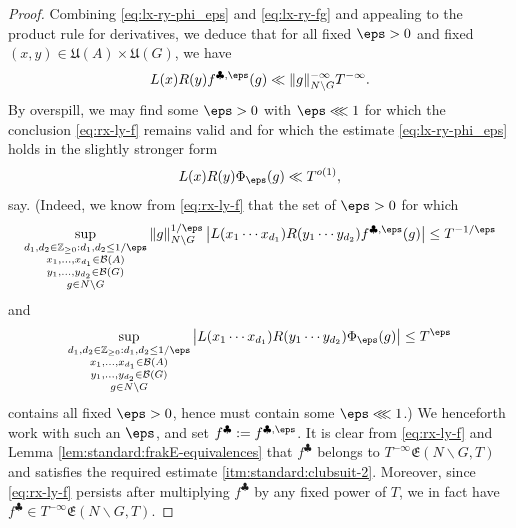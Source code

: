 \begin{proof}
  Combining \eqref{eq:lx-ry-phi_eps} and \eqref{eq:lx-ry-fg} and appealing to the product rule for derivatives, we deduce that for all fixed $\eps > 0$ and fixed $(x,y) \in \mathfrak{U}(A) \times \mathfrak{U}(G)$, we have
  \begin{equation}\label{eq:rx-ly-f}
    L(x) R(y)
    f^{\clubsuit, \eps }(g)
    \ll \|g\|_{N \backslash G}^{-\infty} T^{-\infty}.
  \end{equation}
  By overspill, we may find some $\eps > 0$ with $\eps \lll 1$ for which the conclusion \eqref{eq:rx-ly-f} remains valid and for which the estimate  \eqref{eq:lx-ry-phi_eps} holds in the slightly stronger form
  \begin{equation*}
    L(x) R(y) \Phi_\eps (g) \ll T^{o(1)},
  \end{equation*}
  say.
  (Indeed, we know from \eqref{eq:rx-ly-f} that the set of $\eps > 0$ for which
  \begin{equation*}
    \sup_{
      \substack{
        d_1,d_2 \in \mathbb{Z} _{\geq 0} :   d_1, d_2 \leq 1/\eps \\
        x_1,\dotsc, x_{d_1} \in \mathcal{B}(A) \\
        y_1,\dotsc, y_{d_2} \in \mathcal{B}(G) \\
        g \in N \backslash G}
    }
    \|g\|_{N \backslash G}^{1/\eps}
    \left\lvert L(x_1 \dotsb x_{d_1}) R(y_1 \dotsb y_{d_2}) f^{\clubsuit,\eps}(g) \right\rvert \leq T^{-1/\eps}
  \end{equation*}
  and
  \begin{equation*}
    \sup_{
      \substack{
        d_1,d_2 \in \mathbb{Z} _{\geq 0} :   d_1, d_2 \leq 1/\eps \\
        x_1,\dotsc, x_{d_1} \in \mathcal{B}(A) \\
        y_1,\dotsc, y_{d_2} \in \mathcal{B}(G) \\
        g \in N \backslash G}
    }
    \left\lvert L(x_1 \dotsb x_{d_1}) R(y_1 \dotsb y_{d_2}) \Phi_\eps (g)  \right\rvert \leq T^{\eps}
  \end{equation*}
  contains all fixed $\eps > 0$, hence must contain some $\eps \lll 1$.)  We henceforth work with such an $\eps$, and set $f^{\clubsuit} := f^{\clubsuit, \eps }$.  It is clear from \eqref{eq:rx-ly-f} and Lemma \ref{lem:standard:frakE-equivalences} that $f^{\clubsuit}$ belongs to $T^{-\infty} \mathfrak{E}(N \backslash G, T)$ and satisfies the required estimate \eqref{itm:standard:clubsuit-2}.  Moreover, since \eqref{eq:rx-ly-f} persists after multiplying $f^{\clubsuit}$ by any fixed power of $T$, we in fact have $f^{\clubsuit} \in T^{-\infty}\mathfrak{E}(N \backslash G, T)$.


\end{proof}
